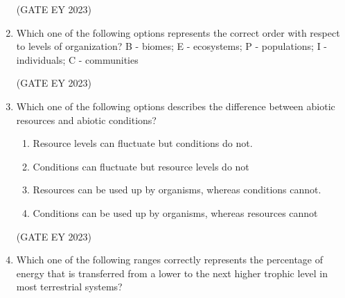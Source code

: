 \documentclass[journal,12pt,onecolumn]{IEEEtran}
\theoremstyle{remark}
\begin{document}
\begin{enumerate}
\hfill{(GATE EY 2023)}

 \item Which one of the following options represents the correct order with respect to
levels of organization?
B - biomes; E - ecosystems; P - populations; I - individuals; C - communities
\begin{enumerate}
\end{enumerate}


\hfill{(GATE EY 2023)}


 \item Which one of the following options describes the difference between abiotic
resources and abiotic conditions?
\begin{enumerate}

\item Resource levels can fluctuate but conditions do not.
\item Conditions can fluctuate but resource levels do not
\item Resources can be used up by organisms, whereas conditions cannot.
\item Conditions can be used up by organisms, whereas resources cannot


\end{enumerate}


\hfill{(GATE EY 2023)}

 \item Which one of the following ranges correctly represents the percentage of energy
that is transferred from a lower to the next higher trophic level in most terrestrial
systems?
\begin{enumerate}
\end{enumerate}


\end{enumerate}
\end{document}

